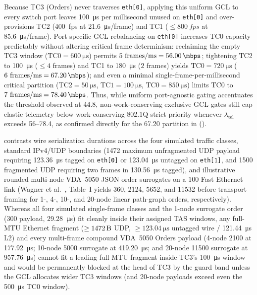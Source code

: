 \documentclass[11pt,a4paper]{article}
\newcommand{\ltel}{\ensuremath{\lambda_{\mathrm{tel}}}}
\begin{document}
Because TC3 (Orders) never traverses \texttt{eth[0]}, applying this uniform GCL to every switch port leaves \qty{100}{\micro\second} per millisecond unused on \texttt{eth[0]} and over-provisions TC2 (\qty{400}{fps} at \qty{21.6}{\micro\second}/frame) and TC1 ($\le \qty{800}{fps}$ at \qty{85.6}{\micro\second}/frame). Port-specific GCL rebalancing on \texttt{eth[0]} increases TC0 capacity predictably without altering critical frame determinism: reclaiming the empty TC3 window ($\text{TC0} = \qty{600}{\micro\second}$) permits $5\text{ frames/ms} = \qty{56.00}{\mbps}$; tightening TC2 to \qty{100}{\micro\second} ($\le 4$ frames) and TC1 to \qty{180}{\micro\second} ($2$ frames) yields $\text{TC0} = \qty{720}{\micro\second}$ ($6\text{ frames/ms} = \qty{67.20}{\mbps}$); and even a minimal single-frame-per-millisecond critical partition ($\text{TC2} = \qty{50}{\micro\second}$, $\text{TC1} = \qty{100}{\micro\second}$, $\text{TC0} = \qty{850}{\micro\second}$) limits TC0 to $7\text{ frames/ms} = \qty{78.40}{\mbps}$. Thus, while uniform port-agnostic gating accentuates the threshold observed at \qty{44.8}{\mbps}, non-work-conserving exclusive GCL gates still cap elastic telemetry below work-conserving 802.1Q strict priority whenever $\ltel$ exceeds \qtyrange{56}{78.4}{\mbps}, as confirmed directly for the \qty{67.20}{\mbps} partition in  ().

 contrasts wire serialization durations across the four simulated traffic classes, standard IPv4/UDP boundaries (\qty{1472}{\byte} maximum unfragmented UDP payload requiring \qty{123.36}{\micro\second} tagged on \texttt{eth[0]} or \qty{123.04}{\micro\second} untagged on \texttt{eth[1]}, and \qty{1500}{\byte} fragmented UDP requiring two frames in \qty{130.56}{\micro\second} tagged), and illustrative rounded multi-node VDA~5050 JSON order surrogates on a \qty{100}{\mbps} Fast Ethernet link (Wagner et al.~\cite{11511549}, Table~I yields \qty{360}{\byte}, \qty{2124}{\byte}, \qty{5652}{\byte}, and \qty{11532}{\byte} before transport framing for 1-, 4-, 10-, and 20-node linear path-graph orders, respectively). Whereas all four simulated single-frame classes and the 1-node surrogate order (\qty{300}{\byte} payload, \qty{29.28}{\micro\second}) fit cleanly inside their assigned TAS windows, any full-MTU Ethernet fragment ($\ge \qty{1472}{\byte}$ UDP, $\ge \qty{123.04}{\micro\second}$ untagged wire / \qty{121.44}{\micro\second} L2) and every multi-frame compound VDA~5050 Orders payload (4-node \qty{2100}{\byte} at \qty{177.92}{\micro\second}; 10-node \qty{5000}{\byte} surrogate at \qty{419.20}{\micro\second}; and 20-node \qty{11500}{\byte} surrogate at \qty{957.76}{\micro\second}) cannot fit a leading full-MTU fragment inside TC3's \qty{100}{\micro\second} window and would be permanently blocked at the head of TC3 by the guard band unless the GCL allocates wider TC3 windows (and 20-node payloads exceed even the \qty{500}{\micro\second} TC0 window).
\end{document}
